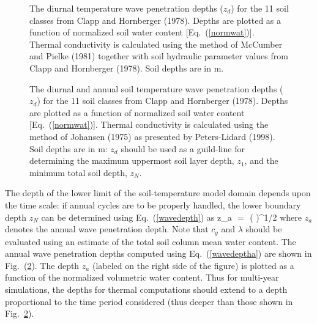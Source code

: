 \begin{figure}[h]
		 \begin{center}
		 \caption{The diurnal temperature wave penetration depths
($z_d$) for the 11 soil classes from Clapp and Hornberger (1978).
Depths are plotted as a function of normalized soil water content
[Eq.~(\ref{normwat})].
Thermal conductivity is calculated using the method of McCumber and Pielke (1981)
together with soil hydraulic parameter values from Clapp and Hornberger (1978).
Soil depths are in m.}
		 \label{wave_figMP}
		 \end{center}
\end{figure}
\begin{figure}[h]
		 \begin{center}
		 \caption{The diurnal and annual soil temperature wave penetration depths
($z_d$) for the 11 soil classes from Clapp and Hornberger (1978).
Depths are plotted as a function of normalized soil water content
[Eq.~(\ref{normwat})].
Thermal conductivity is calculated using the method of Johansen (1975)
as presented by Peters-Lidard \etal (1998).
Soil depths are in m: $z_d$ should be used as a guild-line for
determining the maximum uppermost soil layer depth, $z_1$,
and the minimum total soil depth, $z_N$.}
		 \label{wave_fig}
		 \end{center}
\end{figure}

The depth of the lower limit of the soil-temperature model domain 
depends upon the time scale: if annual cycles are to be properly
handled, the lower boundary depth $z_N$ can be determined
using Eq.~(\ref{wavedepth}) as
%
\beq\label{wavedeptha}
z_a \,\,=\,\, {\left( \right)}^{1/2}
\eeq
%
where $z_a$ denotes the annual wave penetration depth. Note
that $c_g$ and $\lambda$ should be evaluated using an
estimate of the total soil column mean water content.
The annual wave penetration
depths computed using Eq.~(\ref{wavedeptha}) 
are shown in Fig.~(\ref{wave_fig}). The depth $z_a$ 
(labeled on the right side of the figure) is
plotted as a function of the normalized volumetric water content.
Thus for multi-year simulations, the depths for thermal computations
should extend to a depth proportional to the time period considered
(thus deeper than those shown in Fig.~\ref{wave_fig}).


